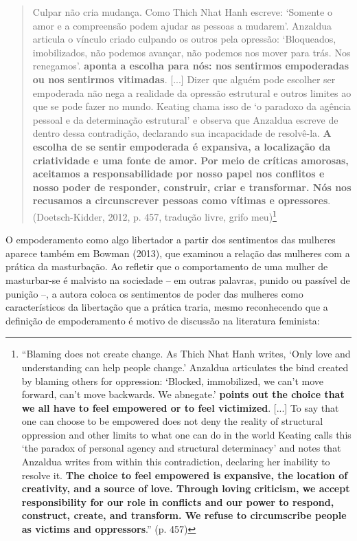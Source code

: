 \begin{quote}
    Culpar não cria mudança. Como Thich Nhat Hanh escreve: ‘Somente o amor e a compreensão podem ajudar as pessoas a mudarem’. Anzaldua articula o vínculo criado culpando os outros pela opressão: ‘Bloqueados, imobilizados, não podemos avançar, não podemos nos mover para trás. Nos renegamos’. \textbf{aponta a escolha para nós: nos sentirmos empoderadas ou nos sentirmos vitimadas}. [...] Dizer que alguém pode escolher ser empoderada não nega a realidade da opressão estrutural e outros limites ao que se pode fazer no mundo. Keating chama isso de ‘o paradoxo da agência pessoal e da determinação estrutural’ e observa que Anzaldua escreve de dentro dessa contradição, declarando sua incapacidade de resolvê-la. \textbf{A escolha de se sentir empoderada é expansiva, a localização da criatividade e uma fonte de amor. Por meio de críticas amorosas, aceitamos a responsabilidade por nosso papel nos conflitos e nosso poder de responder, construir, criar e transformar. Nós nos recusamos a circunscrever pessoas como vítimas e opressores}. (Doetsch-Kidder, 2012, p. 457, tradução livre, grifo meu)\footnote{“Blaming does not create change. As Thich Nhat Hanh writes, ‘Only love and understanding can help people change.’ Anzaldua articulates the bind created by blaming others for oppression: ‘Blocked, immobilized, we can't move forward, can't move backwards. We abnegate.’ \textbf{points out the choice that we all have to feel empowered or to feel victimized}. [...] To say that one can choose to be empowered does not deny the reality of structural oppression and other limits to what one can do in the world Keating calls this ‘the paradox of personal agency and structural determinacy’ and notes that Anzaldua writes from within this contradiction, declaring her inability to resolve it. \textbf{The choice to feel empowered is expansive, the location of creativity, and a source of love. Through loving criticism, we accept responsibility for our role in conflicts and our power to respond, construct, create, and transform. We refuse to circumscribe people as victims and oppressors}.” (p. 457)}
\end{quote}

O empoderamento como algo libertador a partir dos sentimentos das mulheres aparece também em Bowman (2013), que examinou a relação das mulheres com a prática da masturbação. Ao refletir que o comportamento de uma mulher de masturbar-se é malvisto na sociedade – em outras palavras, punido ou passível de punição –, a autora coloca os sentimentos de poder das mulheres como característicos da libertação que a prática traria, mesmo reconhecendo que a definição de empoderamento é motivo de discussão na literatura feminista:

